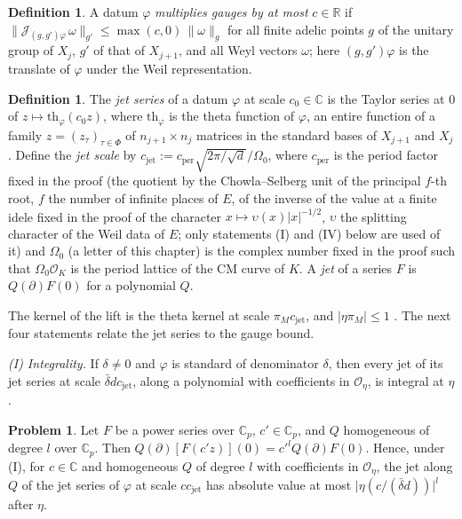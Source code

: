 \documentclass[reqno]{amsart}
\newcounter{chap}
\theoremstyle{plain}
\theoremstyle{definition}
\newtheorem{problem}{Problem}[section]
\newtheorem{definition}[theorem]{Definition}
\theoremstyle{remark}
\newcommand{\C}{{\mathbb{C}}}
\newcommand{\Oc}{\mathcal O}
\newcommand{\Jc}{\mathcal J}
\newcommand{\cjet}{c_{\mathrm{jet}}}
\newcommand{\cper}{c_{\mathrm{per}}}
\newcommand{\nb}[1]{\lVert #1 \rVert}
\begin{document}
\begin{definition}\label{def:raises}
A datum \(\varphi\) \emph{multiplies gauges by at most} \(c \in \mathbb R\) if \(\nb{\Jc_{(g,g')\varphi}\, \omega}_{g'} \le \max(c, 0)\, \nb{\omega}_g\) for all finite adelic points \(g\) of the unitary group of \(X_j\), \(g'\) of that of \(X_{j+1}\), and all Weyl vectors \(\omega\); here \((g, g')\varphi\) is the translate of \(\varphi\) under the Weil representation.
\end{definition}

\begin{definition}\label{def:jet-series}
The \emph{jet series} of a datum \(\varphi\) at scale \(c_0 \in \C\) is the Taylor series at \(0\) of \(z \mapsto \mathrm{th}_\varphi(c_0 z)\), where \(\mathrm{th}_\varphi\) is the theta function of \(\varphi\), an entire function of a family \(z = (z_\tau)_{\tau \in \Phi}\) of \(n_{j+1}\times n_j\) matrices in the standard bases of \(X_{j+1}\) and \(X_j\).  Define the \emph{jet scale} by \(\cjet := \cper\sqrt{2\pi/\sqrt d}/\Omega_0\), where \(\cper\) is the period factor fixed in the proof (the quotient by the Chowla--Selberg unit of the principal \(f\)-th root, \(f\) the number of infinite places of \(E\), of the inverse of the value at a finite idele fixed in the proof of the character \(x \mapsto \upsilon(x)\lvert x\rvert^{-1/2}\), \(\upsilon\) the splitting character of the Weil data of \(E\); only statements (I) and (IV) below are used of it) and \(\Omega_0\) (a letter of this chapter) is the complex number fixed in the proof such that \(\Omega_0\Oc_K\) is the period lattice of the CM curve of \(K\).  A \emph{jet} of a series \(F\) is \(Q(\partial)F(0)\) for a polynomial \(Q\).
\end{definition}

The kernel of the lift is the theta kernel at scale \(\pi_M \cjet\), and \(\lvert \eta \pi_M \rvert \le 1\) \cite{GL}.  The next four statements relate the jet series to the gauge bound.

\emph{(I) Integrality.}  If \(\delta \ne 0\) and \(\varphi\) is standard of denominator \(\delta\), then every jet of its jet series at scale \(\bar\delta d \cjet\), along a polynomial with coefficients in \(\Oc_\eta\), is integral at \(\eta\).

\begin{problem}\label{pr:scaling}
Let \(F\) be a power series over \(\C_p\), \(c' \in \C_p\), and \(Q\) homogeneous of degree \(l\) over \(\C_p\).  Then \(Q(\partial)[F(c'z)](0) = c'^l Q(\partial)F(0)\).  Hence, under (I), for \(c \in \C\) and homogeneous \(Q\) of degree \(l\) with coefficients in \(\Oc_\eta\), the jet along \(Q\) of the jet series of \(\varphi\) at scale \(c\cjet\) has absolute value at most \(\lvert \eta(c/(\bar\delta d)) \rvert^l\) after \(\eta\).
\end{problem}
\end{document}
